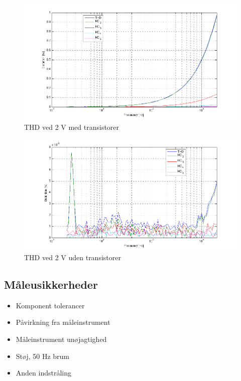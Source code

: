 \begin{figure}[h]
\centering
\includegraphics[width=\textwidth]{maalerapporter/indgangsvaelger/maalinger/opa/mic-2v-opa-muxudgang-thd.png}
\caption{THD ved 2 V med transistorer}
\label{fig:apind:2vm}
\end{figure}

\begin{figure}[h]
\centering
\includegraphics[width=\textwidth]{maalerapporter/indgangsvaelger/maalinger/opa/mic-2v-opa-muxudgang-uden-transistor-thd.png}
\caption{THD ved 2 V uden transistorer}
\label{fig:apind:2vu}
\end{figure}

\clearpage
\subsection*{Måleusikkerheder}
\begin{itemize}
\item Komponent tolerancer
\item Påvirkning fra måleinstrument
\item Måleinstrument unøjagtighed
\item Støj, 50 Hz brum
\item Anden indstråling
\end{itemize}